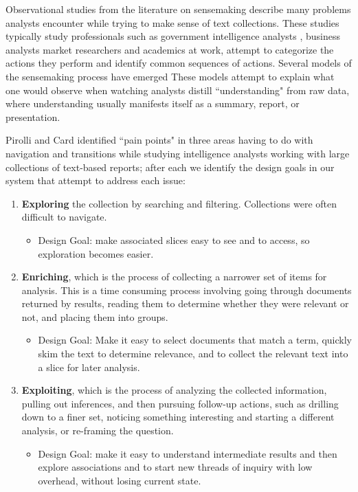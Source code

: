 \documentclass{sig-alternate}
\newcommand{\strong}[1] {\textbf{#1}}
\begin{document}
Observational studies from the literature on sensemaking describe many problems analysts encounter while trying to make sense of text collections. These studies typically study professionals such as government intelligence analysts \cite{pirolli_sensemaking_2005}, business analysts \cite{} market researchers \cite{x} and academics \cite{x} at work, attempt to categorize the actions they perform and identify common sequences of actions. Several models of the sensemaking process have emerged \cite{x} These models attempt to explain what one would observe when watching analysts distill ``understanding" from raw data, where understanding usually manifests itself as a summary, report, or presentation.

Pirolli and Card \cite{pirolli_sensemaking_2005} identified ``pain points" in three areas having to do with navigation and transitions  while studying intelligence analysts working with large collections of text-based reports; after each we identify the design goals in our system that attempt to address each issue:
\begin{enumerate}
\item \strong{Exploring} the collection by searching and filtering. Collections were often difficult to navigate. 
	\begin{itemize}
		\item Design Goal: make associated slices  easy to see and to access, so exploration  becomes easier. 
	\end{itemize}
\item \strong{Enriching}, which is the process of collecting a narrower set of items for analysis. This is a time consuming process involving going through documents returned by results, reading them to determine whether they were relevant or not, and placing them into groups.
	\begin{itemize}
		\item Design Goal: Make it easy to select documents that match a term, quickly skim the text to determine relevance, and to collect the relevant text into a slice for later analysis.
	\end{itemize}
\item \strong{Exploiting}, which is the process of analyzing the collected information, pulling out inferences, and then pursuing  follow-up actions, such as drilling down to a finer set, noticing something interesting and starting a different analysis, or re-framing the question.
	\begin{itemize}
		\item Design Goal: make it easy to understand intermediate results and then explore associations and to start new threads of inquiry with low overhead,  without losing current state.
	\end{itemize}
\end{enumerate}
\end{document}
